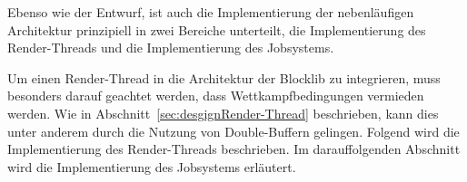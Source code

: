 Ebenso wie der Entwurf, ist auch die Implementierung der nebenläufigen Architektur prinzipiell in zwei Bereiche unterteilt, die Implementierung des Render-Threads und die Implementierung des Jobsystems.

Um einen Render-Thread in die Architektur der Blocklib zu integrieren, muss besonders darauf geachtet werden, dass Wettkampfbedingungen vermieden werden. Wie in Abschnitt~\ref{sec:desgignRender-Thread} beschrieben, kann dies unter anderem durch die Nutzung von Double-Buffern gelingen. Folgend wird die Implementierung des Render-Threads beschrieben. Im darauffolgenden Abschnitt wird die Implementierung des Jobsystems erläutert.